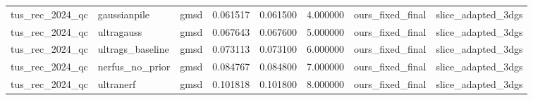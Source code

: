 \begin{tabular}{llllllll}
tus\_rec\_2024\_qc & gaussianpile & gmsd & 0.061517 & 0.061500 & 4.000000 & ours\_fixed\_final & slice\_adapted\_3dgs \\
tus\_rec\_2024\_qc & ultragauss & gmsd & 0.067643 & 0.067600 & 5.000000 & ours\_fixed\_final & slice\_adapted\_3dgs \\
tus\_rec\_2024\_qc & ultrags\_baseline & gmsd & 0.073113 & 0.073100 & 6.000000 & ours\_fixed\_final & slice\_adapted\_3dgs \\
tus\_rec\_2024\_qc & nerfus\_no\_prior & gmsd & 0.084767 & 0.084800 & 7.000000 & ours\_fixed\_final & slice\_adapted\_3dgs \\
tus\_rec\_2024\_qc & ultranerf & gmsd & 0.101818 & 0.101800 & 8.000000 & ours\_fixed\_final & slice\_adapted\_3dgs \\
\end{tabular}
